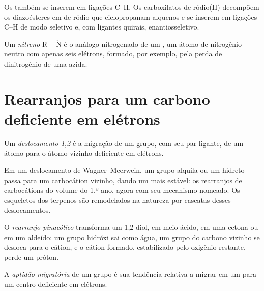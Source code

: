 Os  também se inserem em ligações C--H. Os carboxilatos de ródio(II)
decompõem os diazoésteres em  de ródio que ciclopropanam alquenos e
se inserem em ligações C--H de modo seletivo e, com ligantes quirais, enantiosseletivo.

\begin{definition}[Nitrenos]\label{def:b3:radicals-carbenes:nitrene}
Um \emph{nitreno} $\mathrm{R{-}\ddot N}$ é o análogo nitrogenado de um , um átomo de
nitrogênio neutro com apenas seis elétrons, formado, por exemplo, pela perda de
dinitrogênio de uma azida.
\end{definition}

\section{Rearranjos para um carbono deficiente em elétrons}

\begin{definition}[Deslocamento 1,2]\label{def:b3:radicals-carbenes:shift}
Um \emph{deslocamento 1,2} é a migração de um grupo, com seu par
ligante, de um átomo para o átomo vizinho deficiente em elétrons.
\end{definition}

Em um deslocamento de Wagner--Meerwein, um grupo alquila ou um hidreto passa para um carbocátion
vizinho, dando um mais estável: os rearranjos de carbocátions do
volume do 1.º ano, agora com seu mecanismo nomeado. Os esqueletos dos terpenos são remodelados
na natureza por cascatas desses deslocamentos.

\begin{definition}\label{def:b3:radicals-carbenes:pinacol}
O \emph{rearranjo pinacólico} transforma um 1,2-diol,
em meio ácido, em uma cetona ou em um aldeído: um grupo hidróxi sai como água, um
grupo do carbono vizinho se desloca para o cátion, e o cátion formado,
estabilizado pelo oxigênio restante, perde um próton.
\end{definition}

\begin{definition}\label{def:b3:radicals-carbenes:migratory}
A \emph{aptidão migratória} de um grupo é sua
tendência relativa a migrar em um  para um centro deficiente em elétrons.
\end{definition}

